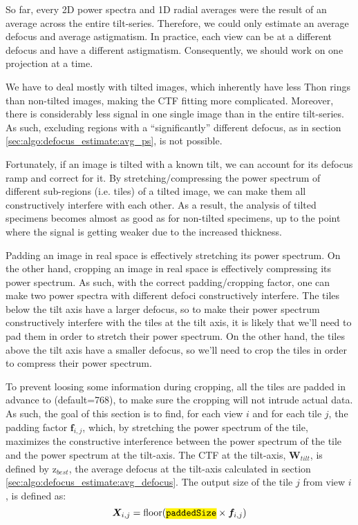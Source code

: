 So far, every 2D power spectra and 1D radial averages were the result of an average across the entire tilt-series. Therefore, we could only estimate an average defocus and average astigmatism. In practice, each view can be at a different defocus and have a different astigmatism. Consequently, we should work on one projection at a time.

We have to deal mostly with tilted images, which inherently have less Thon rings than non-tilted images, making the CTF fitting more complicated. Moreover, there is considerably less signal in one single image than in the entire tilt-series. As such, excluding regions with a ``significantly'' different defocus, as in section \ref{sec:algo:defocus_estimate:avg_ps}, is not possible.
    
Fortunately, if an image is tilted with a known tilt, we can account for its defocus ramp and correct for it. By stretching/compressing the power spectrum of different sub-regions (i.e. tiles) of a tilted image, we can make them all constructively interfere with each other. As a result, the analysis of tilted specimens becomes almost as good as for non-tilted specimens, up to the point where the signal is getting weaker due to the increased thickness.
    
Padding an image in real space is effectively stretching its power spectrum. On the other hand, cropping an image in real space is effectively compressing its power spectrum. As such, with the correct padding/cropping factor, one can make two power spectra with different defoci constructively interfere. The tiles below the tilt axis have a larger defocus, so to make their power spectrum constructively interfere with the tiles at the tilt axis, it is likely that we'll need to pad them in order to stretch their power spectrum. On the other hand, the tiles above the tilt axis have a smaller defocus, so we'll need to crop the tiles in order to compress their power spectrum.

To prevent loosing some information during cropping, all the tiles are padded in advance to  (default=768), to make sure the cropping will not intrude actual data. As such, the goal of this section is to find, for each view $i$ and for each tile $j$, the padding factor $\bm{f}_{i,j}$, which, by stretching the power spectrum of the tile, maximizes the constructive interference between the power spectrum of the tile and the power spectrum at the tilt-axis. The CTF at the tilt-axis, $\bm{W}_{tilt}$, is defined by $\bm{\mathrm{z}}_{best}$, the average defocus at the tilt-axis calculated in section \ref{sec:algo:defocus_estimate:avg_defocus}. The output size of the tile $j$ from view $i$, is defined as:
\begin{equation} \label{eq:scale_size}
    \bm{X}_{i,j} = \mathrm{floor} (\code{paddedSize} \times \bm{f}_{i,j})
\end{equation}

